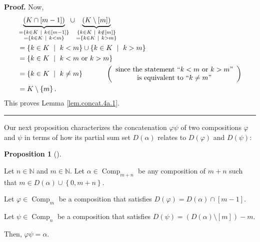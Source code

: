 \documentclass[numbers=enddot,12pt,final,onecolumn,notitlepage]{scrartcl}%
\theoremstyle{definition}
\newtheorem{prop}[theo]{Proposition}
\newenvironment{proposition}[1][]
{\begin{prop}[#1]\begin{leftbar}}
{\end{leftbar}\end{prop}}
\newenvironment{proof}[1][Proof]{\noindent\textbf{#1.} }{\ \rule{0.5em}{0.5em}}
\begin{document}
\begin{proof}
Now,
\begin{align*}
&  \underbrace{\left(  K\cap\left[  m-1\right]  \right)  }%
_{\substack{=\left\{  k\in K\ \mid\ k\in\left[  m-1\right]  \right\}
\\=\left\{  k\in K\ \mid\ k<m\right\}  }}\cup\underbrace{\left(
K\setminus\left[  m\right]  \right)  }_{\substack{\left\{  k\in K\ \mid
\ k\notin\left[  m\right]  \right\}  \\=\left\{  k\in K\ \mid\ k>m\right\}
}}\\
&  =\left\{  k\in K\ \mid\ k<m\right\}  \cup\left\{  k\in K\ \mid\ k>m\right\}
\\
&  =\left\{  k\in K\ \mid\ k<m\text{ or }k>m\right\} \\
&  =\left\{  k\in K\ \mid\ k\neq m\right\}  \ \ \ \ \ \ \ \ \ \ \left(
\begin{array}
[c]{c}%
\text{since the statement \textquotedblleft}k<m\text{ or }%
k>m\text{\textquotedblright}\\
\text{is equivalent to \textquotedblleft}k\neq m\text{\textquotedblright}%
\end{array}
\right) \\
&  =K\setminus\left\{  m\right\}  .
\end{align*}
This proves Lemma \ref{lem.concat.4a.1}.
\end{proof}

Our next proposition characterizes the concatenation $\varphi\psi$ of two
compositions $\varphi$ and $\psi$ in terms of how its partial sum set
$D\left(  \alpha\right)  $ relates to $D\left(  \varphi\right)  $ and
$D\left(  \psi\right)  $:

\begin{proposition}
\label{prop.concat.4a}Let $n\in\mathbb{N}$ and $m\in\mathbb{N}$. Let
$\alpha\in\operatorname*{Comp}\nolimits_{m+n}$ be any composition of $m+n$
such that $m\in D\left(  \alpha\right)  \cup\left\{  0,m+n\right\}  $.

Let $\varphi\in\operatorname*{Comp}\nolimits_{m}$ be a composition that
satisfies $D\left(  \varphi\right)  =D\left(  \alpha\right)  \cap\left[
m-1\right]  $.

Let $\psi\in\operatorname*{Comp}\nolimits_{n}$ be a composition that satisfies
$D\left(  \psi\right)  =\left(  D\left(  \alpha\right)  \setminus\left[
m\right]  \right)  -m$.

Then, $\varphi\psi=\alpha$.
\end{proposition}
\end{document}
